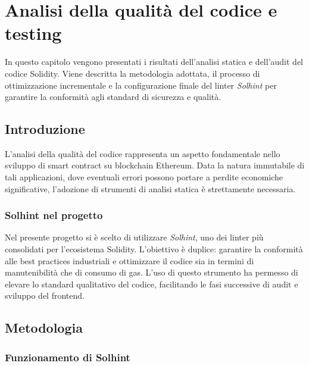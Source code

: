 \chapter{Analisi della qualità del codice e testing}

\begin{preamble}
In questo capitolo vengono presentati i risultati dell'analisi statica e dell'audit del codice Solidity. Viene descritta la metodologia adottata, il processo di ottimizzazione incrementale e la configurazione finale del linter \textit{Solhint} per garantire la conformità agli standard di sicurezza e qualità.
\end{preamble}

\section{Introduzione}

L'analisi della qualità del codice rappresenta un aspetto fondamentale nello sviluppo di smart contract su blockchain Ethereum. Data la natura immutabile di tali applicazioni, dove eventuali errori possono portare a perdite economiche significative, l'adozione di strumenti di analisi statica è strettamente necessaria.

\subsection{Solhint nel progetto}

Nel presente progetto si è scelto di utilizzare \textit{Solhint}, uno dei linter più consolidati per l'ecosistema Solidity. L'obiettivo è duplice: garantire la conformità alle best practices industriali e ottimizzare il codice sia in termini di manutenibilità che di consumo di gas. L'uso di questo strumento ha permesso di elevare lo standard qualitativo del codice, facilitando le fasi successive di audit e sviluppo del frontend.

\section{Metodologia}

\subsection{Funzionamento di Solhint}

